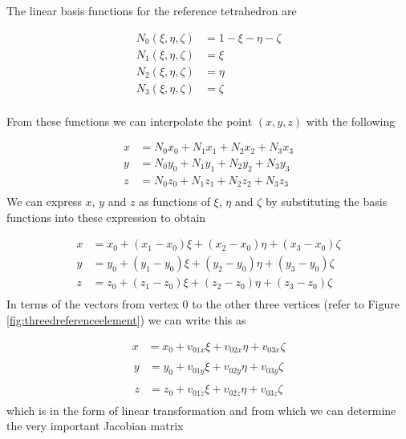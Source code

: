 \documentclass[11pt,letterpaper,titlepage]{article}
\newcommand{\beq}{\begin{equation*}
\begin{aligned}}
\newcommand{\eeq}{\end{aligned}
\end{equation*}}
\newcommand{\beqn}{\begin{equation}
	\begin{aligned}}
\newcommand{\eeqn}{\end{aligned}
	\end{equation}}
\numberwithin{equation}{section}
\begin{document}
The linear basis functions for the reference tetrahedron are

\beq 
N_0(\xi,\eta,\zeta) &= 1 - \xi - \eta - \zeta \\
N_1(\xi,\eta,\zeta) &= \xi \\
N_2(\xi,\eta,\zeta) &= \eta \\
N_3(\xi,\eta,\zeta) &= \zeta \\
\eeq 

From these functions we can interpolate the point $(x,y,z)$ with the following

\beq 
x &= N_0 x_0 + N_1 x_1 + N_2 x_2 + N_3 x_3 \\
y &= N_0 y_0 + N_1 y_1 + N_2 y_2 + N_3 y_3 \\
z &= N_0 z_0 + N_1 z_1 + N_2 z_2 + N_3 z_3 \\
\eeq 
\newline
We can express $x$, $y$ and $z$ as functions of $\xi$, $\eta$ and $\zeta$ by substituting the basis functions into these expression to obtain

\beq 
x &= x_0 + (x_1-x_0)\xi + (x_2-x_0)\eta + (x_3-x_0)\zeta \\
y &= y_0 + (y_1-y_0)\xi + (y_2-y_0)\eta + (y_3-y_0)\zeta \\
z &= z_0 + (z_1-z_0)\xi + (z_2-z_0)\eta + (z_3-z_0)\zeta \\
\eeq 
\newline
In terms of the vectors from vertex $0$ to the other three vertices (refer to Figure \ref{fig:threedreferenceelement}) we can write this as

\beqn 
x &= x_0 + v_{01x}\xi + v_{02x}\eta + v_{03x}\zeta \\
\eeqn 
\beqn 
y &= y_0 + v_{01y}\xi + v_{02y}\eta + v_{03y}\zeta \\
\eeqn 
\beqn 
z &= z_0 + v_{01z}\xi + v_{02z}\eta + v_{03z}\zeta \\
\eeqn 
\newline
which is in the form of linear transformation and from which we can determine the very important Jacobian matrix
\end{document}
